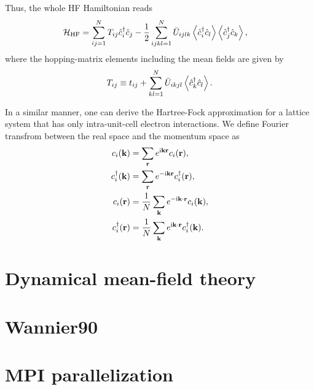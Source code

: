 \documentclass[submission, LectureNotes]{SciPost}
\newcommand{\hatc}{{\ensuremath{\hat{c}}}}
\newcommand{\bk}{\ensuremath{{\bf k}}}
\newcommand{\br}{\ensuremath{{\bf r}}}
\newcommand\ii{\mathrm{i}}%
\begin{document}
Thus, the whole HF Hamiltonian reads
\begin{align}
\mathcal{H}_\mathrm{HF} &= \sum_{ij=1}^N T_{ij} \hatc_i^\dagger \hatc_j -\frac{1}{2}\sum_{ijkl=1}^N \bar{U}_{ijlk}\expval{\hat{c}^\dagger_i \hat{c}_l} \expval{\hat{c}^\dagger_j \hat{c}_k},
\end{align}
where the hopping-matrix elements including the mean fields are given by
\begin{align}
T_{ij} \equiv t_{ij} + \sum_{kl=1}^N \bar{U}_{i k j l} \expval{\hatc^\dagger_k \hatc_l}.\label{eq:Tij}
\end{align}

In a similar manner, one can derive the Hartree-Fock approximation for a lattice system that
has only intra-unit-cell electron interactions.
We define Fourier transfrom between the real space and the momentum space as
\begin{align}
    c_i(\bk) &=  \sum_{\bf r} e^{\ii {\bf k} {\bf r}} c_i({\bf r}),\\
    c^\dagger_i(\bk) &=  \sum_{\bf r} e^{-\ii {\bf k} {\bf r}} c^\dagger_i({\bf r}),\\
    c_i(\br) &= \frac{1}{{N}} \sum_\bk e^{-\ii \bk\cdot\br} c_i(\bk),\\
    c^\dagger_i(\br) &= \frac{1}{{N}} \sum_\bk e^{\ii \bk\cdot\br} c^\dagger_i(\bk).
\end{align}


\clearpage
\section{Dynamical mean-field theory}

\clearpage
\section{Wannier90}

\clearpage
\section{MPI parallelization}

\begin{appendix}
\end{appendix}



\nolinenumbers
\end{document}
